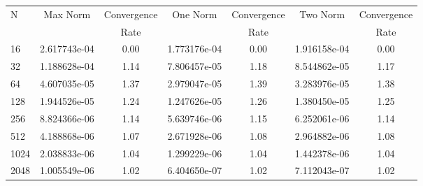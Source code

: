 \documentclass[12pt]{article}
\begin{document}
	\begin{tabular}{l|c|c|c|c|c|c}
		N&Max Norm&Convergence&One Norm&Convergence&Two Norm&Convergence\\
		&&Rate&&Rate&&Rate\\
		\hline
		16&2.617743e-04&0.00&1.773176e-04&0.00&1.916158e-04&0.00\\
		\hline
		32&1.188628e-04&1.14&7.806457e-05&1.18&8.544862e-05&1.17\\
		\hline
		64&4.607035e-05&1.37&2.979047e-05&1.39&3.283976e-05&1.38\\
		\hline
		128&1.944526e-05&1.24&1.247626e-05&1.26&1.380450e-05&1.25\\
		\hline
		256&8.824366e-06&1.14&5.639746e-06&1.15&6.252061e-06&1.14\\
		\hline
		512&4.188868e-06&1.07&2.671928e-06&1.08&2.964882e-06&1.08\\
		\hline
		1024&2.038833e-06&1.04&1.299229e-06&1.04&1.442378e-06&1.04\\
		\hline
		2048&1.005549e-06&1.02&6.404650e-07&1.02&7.112043e-07&1.02\\
	\end{tabular}
\end{document}
